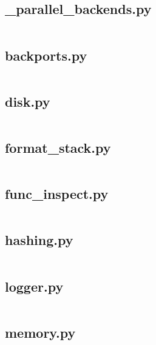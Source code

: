 \documentclass{article}
\begin{document}
\subsection{\_parallel\_backends.py}
\inputminted{python}{/home/dufferzafar/dev/@clones/scikit-learn/sklearn/externals/joblib/_parallel_backends.py}
\newpage

\subsection{backports.py}
\inputminted{python}{/home/dufferzafar/dev/@clones/scikit-learn/sklearn/externals/joblib/backports.py}
\newpage

\subsection{disk.py}
\inputminted{python}{/home/dufferzafar/dev/@clones/scikit-learn/sklearn/externals/joblib/disk.py}
\newpage

\subsection{format\_stack.py}
\inputminted{python}{/home/dufferzafar/dev/@clones/scikit-learn/sklearn/externals/joblib/format_stack.py}
\newpage

\subsection{func\_inspect.py}
\inputminted{python}{/home/dufferzafar/dev/@clones/scikit-learn/sklearn/externals/joblib/func_inspect.py}
\newpage

\subsection{hashing.py}
\inputminted{python}{/home/dufferzafar/dev/@clones/scikit-learn/sklearn/externals/joblib/hashing.py}
\newpage

\subsection{logger.py}
\inputminted{python}{/home/dufferzafar/dev/@clones/scikit-learn/sklearn/externals/joblib/logger.py}
\newpage

\subsection{memory.py}
\inputminted{python}{/home/dufferzafar/dev/@clones/scikit-learn/sklearn/externals/joblib/memory.py}
\newpage
\end{document}
